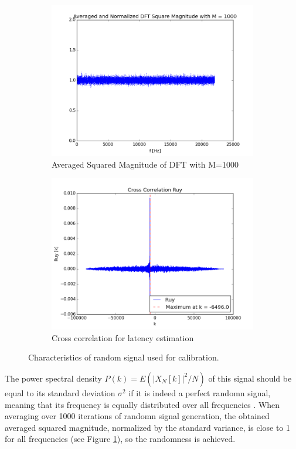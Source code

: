 \begin{figure}[htb]
\begin{subfigure}[b]{0.49\linewidth}
        \includegraphics[width=\linewidth]{files/random_M1000.png}
        \caption{Averaged Squared Magnitude of DFT with M=1000}
        \label{fig:random_M1000}
    \end{subfigure}
    \begin{subfigure}[b]{0.49\linewidth}
        \includegraphics[width=\linewidth]{files/audio_ruy.png}
        \caption{Cross correlation for latency estimation}
        \label{fig:audio_ruy}
    \end{subfigure}
    \caption{Characteristics of random signal used for calibration.} 
	\label{fig:random}
\end{figure}

The power spectral density $P(k)=E(|X_N[k]|^2/N)$ of this signal should be equal to its standard deviation $\sigma^2$ if it is indeed a perfect randomn signal, meaning that its frequency is equally distributed over all frequencies \cite{Vetterli}.
When averaging over 1000 iterations of randomn signal generation, the obtained averaged squared magnitude, normalized by the standard variance, is close to 1 for all frequencies (see Figure \ref{fig:random_M1000}), so the randomness is achieved.

